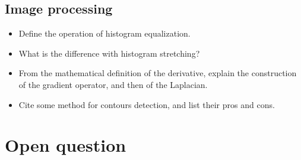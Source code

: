 
\subsection{Image processing}
\begin{qbox}
\begin{itemize}
 \item Define the operation of histogram equalization. 
 \item What is the difference with histogram stretching? 
 \end{itemize}
 \end{qbox}
 
 \begin{qbox}
 \begin{itemize}
 \item From the mathematical definition of the derivative, explain the construction of the gradient operator, and then of the Laplacian. 
 \item Cite some method for contours detection, and list their pros and cons. 
\end{itemize}
\end{qbox}

% 

\section{Open question}

